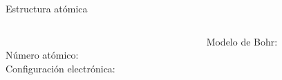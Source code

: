 \documentclass[aspectratio=169]{beamer}
\begin{document}
\begin{frame}{Estructura atómica}
    \begin{columns}[onlytextwidth]
    \begin{column}{0.6\textwidth}
        \textbf{}\\[8pt]
        Número atómico: \\[8pt]
        Configuración electrónica:\\[8pt] 
        \\[8pt]  
        \end{column}
    \begin{column}{0.4\textwidth}
    \begin{center}
        Modelo de Bohr:\\[8pt]
    \end{center}
\end{column}
\end{columns}
\end{frame}
\end{document}
